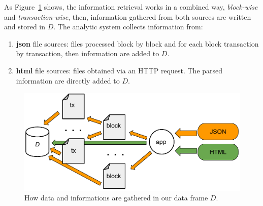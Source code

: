 \documentclass[USenglish]{uit-thesis}
\begin{document}
As Figure~\ref{fig:retrieval_scheme} shows,
the information retrieval works
in a combined way, \emph{block-wise} and \emph{transaction-wise},
then, information gathered from both sources are
written and stored in $D$. The analytic system
collects information from:
\begin{enumerate}[noitemsep]
	\item \textbf{\gls{json}} file sources: files processed block by block and
	for each block transaction by transaction, then information are added to $D$.
	\item \textbf{\gls{html}} file sources: files obtained via an HTTP request. The parsed information are directly added to $D$.
	
\end{enumerate}
\begin{figure}[h]
	\centering
	\includegraphics[width=1\textwidth]{img/retrieval_scheme}
	\caption{How data and informations are gathered in our data frame $D$.}
	\label{fig:retrieval_scheme}
\end{figure}
\end{document}

